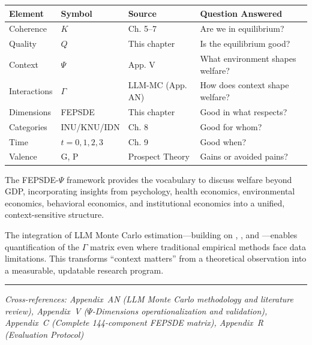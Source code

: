 \begin{center}
\renewcommand{\arraystretch}{1.4}
\begin{tabular}{llll}
\hline
\textbf{Element} & \textbf{Symbol} & \textbf{Source} & \textbf{Question Answered} \\
\hline
Coherence & $K$ & Ch. 5--7 & Are we in equilibrium? \\
Quality & $Q$ & This chapter & Is the equilibrium good? \\
Context & $\Psi$ & App. V & What environment shapes welfare? \\
Interactions & $\Gamma$ & LLM-MC (App. AN) & How does context shape welfare? \\
Dimensions & FEPSDE & This chapter & Good in what respects? \\
Categories & INU/KNU/IDN & Ch. 8 & Good for whom? \\
Time & $t = 0,1,2,3$ & Ch. 9 & Good when? \\
Valence & G, P & Prospect Theory & Gains or avoided pains? \\
\hline
\end{tabular}
\end{center}

The FEPSDE-$\Psi$ framework provides the vocabulary to discuss welfare
beyond GDP, incorporating insights from psychology, health economics,
environmental economics, behavioral economics, and institutional economics
into a unified, context-sensitive structure.

The integration of LLM Monte Carlo estimation---building on \citet{zhu2024eliciting},
\citet{llmpriors2025scientific}, and \citet{nafar2025extracting}---enables
quantification of the $\Gamma$ matrix even where traditional empirical methods
face data limitations. This transforms ``context matters'' from a theoretical
observation into a measurable, updatable research program.

\begin{center}
\end{center}

\vspace{1em}
\hrule
\vspace{0.5em}
\noindent\textit{Cross-references: Appendix~AN (LLM Monte Carlo methodology and literature review), 
Appendix~V ($\Psi$-Dimensions operationalization and validation), 
Appendix~C (Complete 144-component FEPSDE matrix),
Appendix~R (Evaluation Protocol)}

